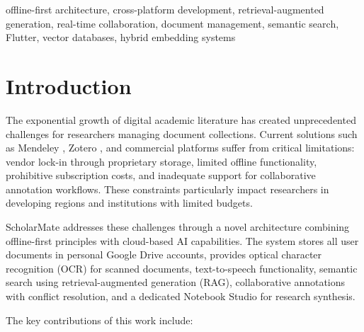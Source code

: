 \documentclass[conference]{IEEEtran}
\begin{document}
\begin{IEEEkeywords}
offline-first architecture, cross-platform development, retrieval-augmented generation, real-time collaboration, document management, semantic search, Flutter, vector databases, hybrid embedding systems
\end{IEEEkeywords}

\section{Introduction}

The exponential growth of digital academic literature has created unprecedented challenges for researchers managing document collections. Current solutions such as Mendeley \cite{b1}, Zotero \cite{b2}, and commercial platforms suffer from critical limitations: vendor lock-in through proprietary storage, limited offline functionality, prohibitive subscription costs, and inadequate support for collaborative annotation workflows. These constraints particularly impact researchers in developing regions and institutions with limited budgets.


ScholarMate addresses these challenges through a novel architecture combining offline-first principles with cloud-based AI capabilities. The system stores all user documents in personal Google Drive accounts, provides optical character recognition (OCR) for scanned documents, text-to-speech functionality, semantic search using retrieval-augmented generation (RAG), collaborative annotations with conflict resolution, and a dedicated Notebook Studio for research synthesis.

The key contributions of this work include:
\end{document}
